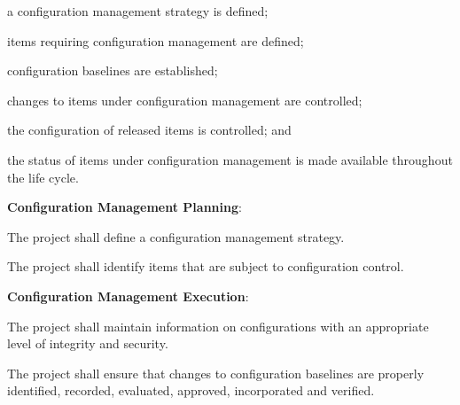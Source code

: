 			\begin{adjustwidth}{2em}{0pt} 

				\begin{compactitem}

					\item a configuration management strategy is defined;

					\item items requiring configuration management are defined;

					\item configuration baselines are established;

					\item changes to items under configuration management are controlled;

					\item the configuration of released items is controlled; and

					\item the status of items under configuration management is made available throughout the life cycle.

				\end{compactitem}

			\end{adjustwidth}

			\begin{adjustwidth}{2em}{0pt} 

				\begin{compactenum}

					\item {\bf Configuration Management Planning}:

					\begin{compactenum}

						\item The project shall define a configuration management strategy.

						\item The project shall identify items that are subject to configuration control.

					\end{compactenum}

					\item {\bf Configuration Management Execution}:

					\begin{compactenum}

						\item The project shall maintain information on configurations with an appropriate level of integrity and security.

						\item The project shall ensure that changes to configuration baselines are properly identified, recorded, evaluated, approved, incorporated and verified.

					\end{compactenum}

				\end{compactenum}

			\end{adjustwidth}

